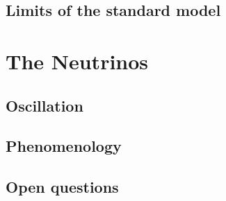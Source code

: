 
\subsection{Limits of the standard model}
\section{The Neutrinos}
\label{sec:neutrino:th}




\subsection{Oscillation}
\label{sec:th:osc}

\subsection{Phenomenology}

\subsection{Open questions}
